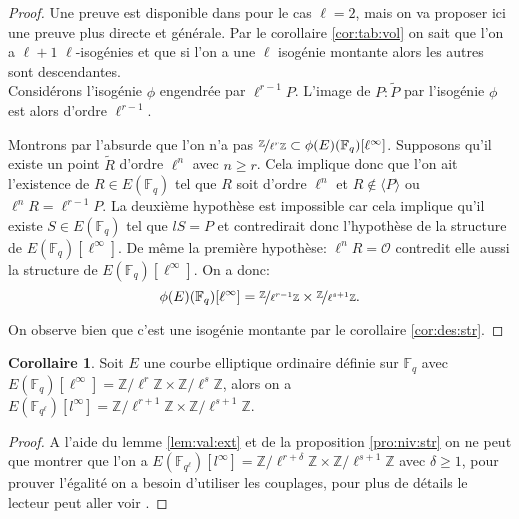 \documentclass[10pt,a4paper]{book}
\theoremstyle{plain}
\theoremstyle{definition}
\theoremstyle{definition}
\newtheorem{cor}[thm]{Corollaire}
\theoremstyle{definition}
\theoremstyle{definition}
\theoremstyle{remark}
\theoremstyle{remark}
\theoremstyle{definition}
\begin{document}
\begin{proof}
Une preuve est disponible dans\cite[Proposition 4]{MiretMSTV08} pour le cas $\ell=2$, mais on va proposer ici une preuve plus directe et générale.
Par le corollaire \ref{cor:tab:vol} on sait que l'on a $\ell+1$ $\ell$-isogénies et que si l'on a une $\ell$ isogénie montante alors les  autres sont descendantes.
\\
Considérons l'isogénie $\phi$ engendrée par $\ell^{r-1}P$. L'image de $P:\widetilde{P}$ par l'isogénie $\phi$ est alors d'ordre $\ell^{r-1}$. 

Montrons par l'absurde que l'on n'a pas $\nicefrac{\mathbb{Z}}{\ell^{r}\mathbb{Z}} \subset \phi(E)(\mathbb{F}_q)[\ell^{\infty}]$. Supposons qu'il existe un point $\widetilde{R}$ d'ordre $\ell^n$ avec $n \geqslant r$. Cela implique donc que l'on ait l'existence de $R \in E(\mathbb{F}_q)$ tel que $R$ soit d'ordre $\ell^n$ et $R \notin \langle P \rangle$ ou  $\ell^nR =\ell^{r-1}P$. La deuxième hypothèse est impossible car cela implique qu'il existe $S \in E(\mathbb{F}_q)$ tel que $l S=P$ et contredirait donc l'hypothèse de la structure de $E(\mathbb{F}_q)[\ell^{\infty}]$. De même la première hypothèse: $\ell^nR = \mathcal{O}$ contredit elle aussi la structure de $E(\mathbb{F}_q)[\ell^{\infty}]$. On a donc:
\[\phi(E)(\mathbb{F}_q)[\ell^{\infty}]=\nicefrac{\mathbb{Z}}{\ell^{r-1}\mathbb{Z}} \times \nicefrac{\mathbb{Z}}{\ell^{s+1}\mathbb{Z}}. \]

On observe bien que c'est une isogénie montante par le corollaire \ref{cor:des:str}.
\end{proof}

\begin{cor} 
\label{cor:struct:ext}
Soit $E$ une courbe elliptique ordinaire définie sur $\mathbb{F}_q$ avec $E(\mathbb{F}_{q})[\ell^{\infty}]=\mathbb{Z} / \ell^{r} \mathbb{Z} \times \mathbb{Z} / \ell^{s} \mathbb{Z}$, alors on a $E(\mathbb{F}_{q^{\ell}})[l^{\infty}]=\mathbb{Z} / \ell^{r+1} \mathbb{Z} \times \mathbb{Z} / \ell^{s+1} \mathbb{Z}$.
\end{cor}

\begin{proof}
A l'aide du lemme \ref{lem:val:ext} et de la proposition \ref{pro:niv:str} on ne peut que montrer que l'on a  $E(\mathbb{F}_{q^{\ell}})[l^{\infty}]=\mathbb{Z} / \ell^{r+\delta} \mathbb{Z} \times \mathbb{Z} / \ell^{s+1} \mathbb{Z}$ avec $\delta \geqslant 1$, pour prouver l'égalité on a besoin d'utiliser les couplages, pour plus de détails le lecteur peut aller voir \cite[§5.3.1]{Ionica2010}.
\end{proof}
\end{document}
